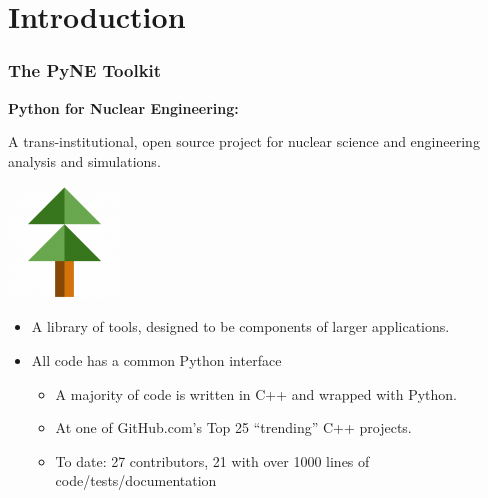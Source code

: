 \documentclass[12pt]{beamer}
\begin{document}
\section{Introduction}
\begin{frame}[fragile]
\frametitle{The PyNE Toolkit}

\centerline{\bf Python for Nuclear Engineering:}
A trans-institutional, open source project for nuclear science and engineering analysis and simulations.

\centerline{\includegraphics[width=3cm]{figures/pyne_icon_small.png}}

\begin{itemize}
\item{A library of tools, designed to be components of larger applications.}
\item{All code has a common Python interface}
\begin{itemize}
\item{A majority of code is written in C++ and wrapped with Python.}
\item{At one of GitHub.com's Top 25 ``trending'' C++ projects.}
\item{To date: 27 contributors, 21 with over 1000 lines of code/tests/documentation}
\end{itemize}
\end{itemize}


\end{frame}
\end{document}
